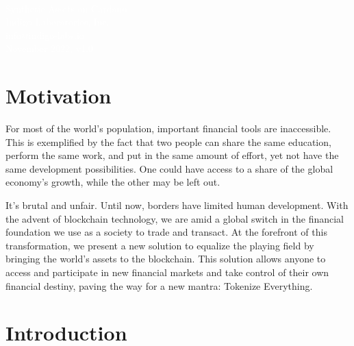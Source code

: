 \documentclass{article}
\begin{document}
\begin{sloppypar}

\begin{titlepage}
\sffamily\selectfont
\centering
\vspace*{7cm}
{}\\[5\baselineskip]
\textcolor{white}{
{\Huge Synthetic Assets on Cardano}\\[2\baselineskip]
{\Large Indigo Laboratories, Inc.}\\[0.5\baselineskip]
{\large info@indigo-labs.io}\\[3\baselineskip]
{\large November 2022, v1.0}
}
\end{titlepage}

\tableofcontents

\hypertarget{motivation}{%
\section{Motivation}\label{motivation}}

For most of the world's population, important financial tools are
inaccessible. This is exemplified by the fact that two people can share
the same education, perform the same work, and put in the same amount of
effort, yet not have the same development possibilities. One could have
access to a share of the global economy's growth, while the other may be
left out.

It's brutal and unfair. Until now, borders have limited human
development. With the advent of blockchain technology, we are amid a
global switch in the financial foundation we use as a society to trade
and transact. At the forefront of this transformation, we present a new
solution to equalize the playing field by bringing the world's assets to
the blockchain. This solution allows anyone to access and participate in
new financial markets and take control of their own financial destiny,
paving the way for a new mantra: Tokenize Everything.

\hypertarget{introduction}{%
\section{Introduction}\label{introduction}}


\end{sloppypar}
\end{document}
